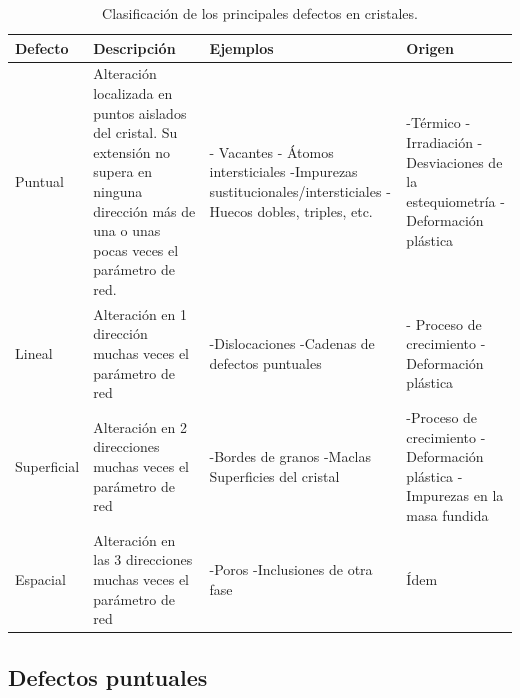 \begin{table}[h!] \centering
    \begin{tabular}{m{2cm} | m{4cm} | m{4cm} | m{4cm}}
        Defecto & Descripción & Ejemplos & Origen \\ \hline \hline
        Puntual & Alteración localizada en puntos aislados del cristal. Su extensión no supera en ninguna dirección más de una o unas pocas veces el parámetro de red. & - Vacantes \newline - Átomos intersticiales \newline -Impurezas sustitucionales/intersticiales \newline -Huecos dobles, triples, etc. & -Térmico \newline -Irradiación \newline -Desviaciones de la estequiometría \newline -Deformación plástica \\ \hline
        Lineal & Alteración en 1 dirección muchas veces el parámetro de red & -Dislocaciones \newline -Cadenas de defectos puntuales & - Proceso de crecimiento \newline -Deformación plástica \\ \hline
        Superficial & Alteración en 2 direcciones muchas veces el parámetro de red & -Bordes de granos \newline -Maclas \newline Superficies del cristal & -Proceso de crecimiento \newline -Deformación plástica \newline -Impurezas en la masa fundida \\ \hline
        Espacial & Alteración en las 3 direcciones muchas veces el parámetro de red & -Poros \newline -Inclusiones de otra fase & Ídem \\ \hline
    \end{tabular}
    \caption{Clasificación de los principales defectos en cristales.}
    \label{Tab:01-02}
\end{table}





\subsection{Defectos puntuales} \label{Subsec:01-06-01}

